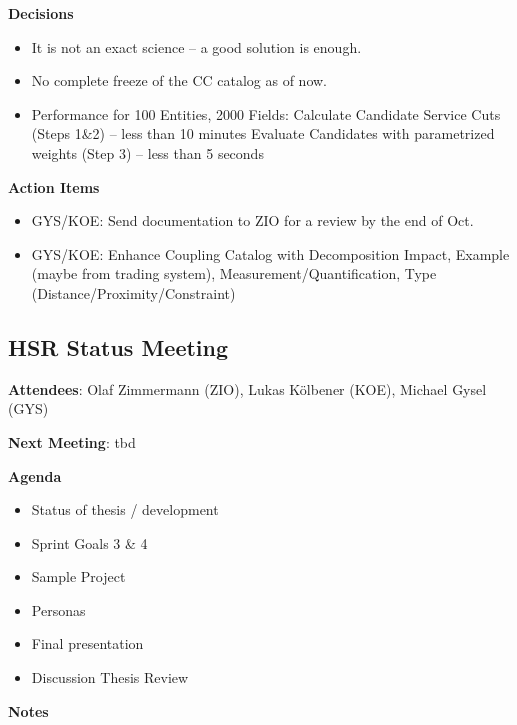 \textbf{Decisions}

\begin{itemize}
\item It is not an exact science – a good solution is enough.
\item No complete freeze of the CC catalog as of now.
\item Performance for 100 Entities, 2000 Fields:
\subitem Calculate Candidate Service Cuts (Steps 1\&2) – less than 10 minutes
\subitem Evaluate Candidates with parametrized weights (Step 3) – less than 5 seconds
\end{itemize}
 
\textbf{Action Items}

\begin{itemize}
\item GYS/KOE: Send documentation to ZIO for a review by the end of Oct.
\item GYS/KOE: Enhance Coupling Catalog with Decomposition Impact, Example (maybe from trading system), Measurement/Quantification, Type (Distance/Proximity/Constraint)
\end{itemize}

\subsection{HSR Status Meeting }

\textbf{Attendees}: Olaf Zimmermann (ZIO), Lukas Kölbener (KOE), Michael Gysel (GYS)
 
\textbf{Next Meeting}: tbd

\textbf{Agenda}

\begin{itemize}
\item Status of thesis / development
\item Sprint Goals 3 \& 4
\item Sample Project
\item Personas
\item Final presentation
\item Discussion Thesis Review
\end{itemize}

\textbf{Notes}

